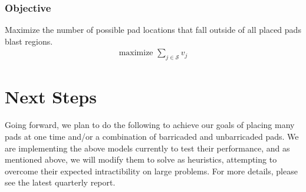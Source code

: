 \documentclass[10pt]{article}
\begin{document}
	\subsubsection{Objective}
	Maximize the number of possible pad locations that fall outside of all placed pads blast regions.
	\begin{align}
	 	\text{maximize } \sum_{j \in \mathcal{S}} v_j
	\end{align}
  	
	
	\section{Next Steps}
	Going forward, we plan to do the following to achieve our goals of placing many pads at one time and/or a combination of barricaded and unbarricaded pads. We are implementing the above models currently to test their performance, and as mentioned above, we will modify them to solve as heuristics, attempting to overcome their expected intractibility on large problems. For more details, please see the latest quarterly report.
	
	
	
\end{document}
